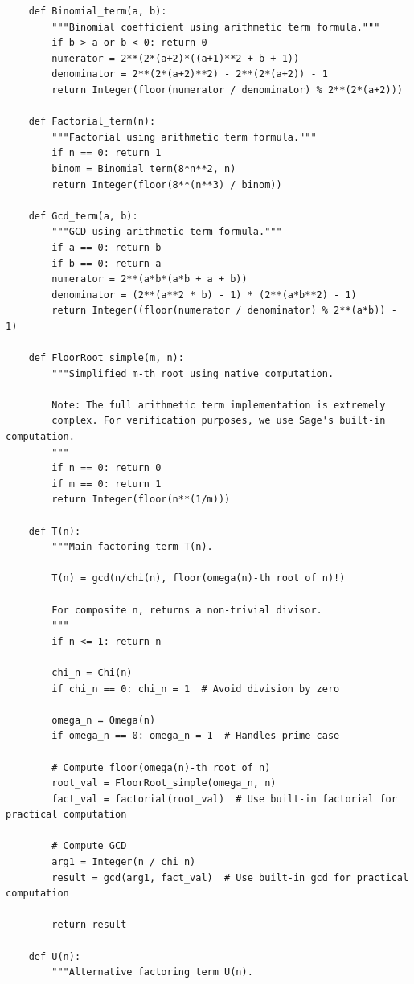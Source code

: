 \documentclass[10pt]{article}
\theoremstyle{plain}
\begin{document}
{\begin{verbatim}
    def Binomial_term(a, b):
        """Binomial coefficient using arithmetic term formula."""
        if b > a or b < 0: return 0
        numerator = 2**(2*(a+2)*((a+1)**2 + b + 1))
        denominator = 2**(2*(a+2)**2) - 2**(2*(a+2)) - 1
        return Integer(floor(numerator / denominator) % 2**(2*(a+2)))
    
    def Factorial_term(n):
        """Factorial using arithmetic term formula."""
        if n == 0: return 1
        binom = Binomial_term(8*n**2, n)
        return Integer(floor(8**(n**3) / binom))
    
    def Gcd_term(a, b):
        """GCD using arithmetic term formula."""
        if a == 0: return b
        if b == 0: return a
        numerator = 2**(a*b*(a*b + a + b))
        denominator = (2**(a**2 * b) - 1) * (2**(a*b**2) - 1)
        return Integer((floor(numerator / denominator) % 2**(a*b)) - 1)
    
    def FloorRoot_simple(m, n):
        """Simplified m-th root using native computation.
        
        Note: The full arithmetic term implementation is extremely
        complex. For verification purposes, we use Sage's built-in computation.
        """
        if n == 0: return 0
        if m == 0: return 1
        return Integer(floor(n**(1/m)))
    
    def T(n):
        """Main factoring term T(n).
        
        T(n) = gcd(n/chi(n), floor(omega(n)-th root of n)!)
        
        For composite n, returns a non-trivial divisor.
        """
        if n <= 1: return n
        
        chi_n = Chi(n)
        if chi_n == 0: chi_n = 1  # Avoid division by zero
        
        omega_n = Omega(n)
        if omega_n == 0: omega_n = 1  # Handles prime case
        
        # Compute floor(omega(n)-th root of n)
        root_val = FloorRoot_simple(omega_n, n)
        fact_val = factorial(root_val)  # Use built-in factorial for practical computation
        
        # Compute GCD
        arg1 = Integer(n / chi_n)
        result = gcd(arg1, fact_val)  # Use built-in gcd for practical computation
        
        return result
    
    def U(n):
        """Alternative factoring term U(n).
        

\end{verbatim}}
\end{document}
